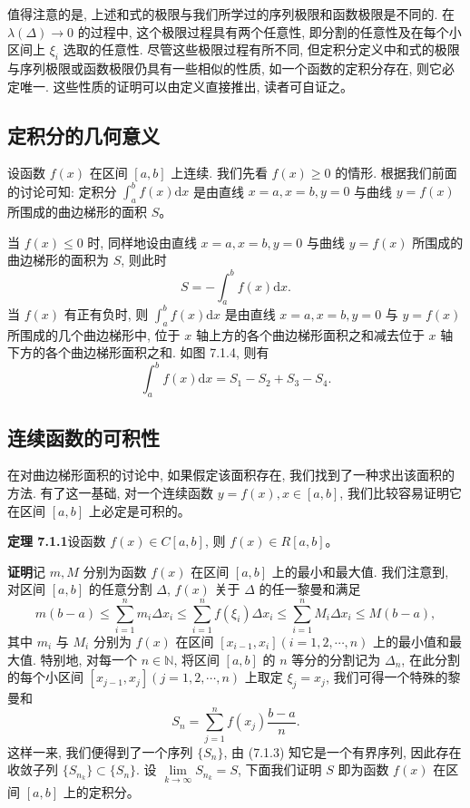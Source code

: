 \documentclass[UTF8, 12pt, fontset=fandol, oneside]{ctexart}
\begin{document}
值得注意的是, 上述和式的极限与我们所学过的序列极限和函数极限是不同的. 在 $\lambda(\Delta)\to0$ 的过程中, 这个极限过程具有两个任意性, 即分割的任意性及在每个小区间上 $\xi_i$ 选取的任意性. 尽管这些极限过程有所不同, 但定积分定义中和式的极限与序列极限或函数极限仍具有一些相似的性质, 如一个函数的定积分存在, 则它必定唯一. 这些性质的证明可以由定义直接推出, 读者可自证之。

\subsection{定积分的几何意义}

设函数 $f(x)$ 在区间 $[a,b]$ 上连续. 我们先看 $f(x)\geq0$ 的情形. 根据我们前面的讨论可知: 定积分 $\int_a^b f(x)\mathrm dx$ 是由直线 $x=a,x=b,y=0$ 与曲线 $y=f(x)$ 所围成的曲边梯形的面积 $S$。

当 $f(x)\leq0$ 时, 同样地设由直线 $x=a,x=b,y=0$ 与曲线 $y=f(x)$ 所围成的曲边梯形的面积为 $S$, 则此时
\[
  S=-\int_a^b f(x)\mathrm dx.
\]
当 $f(x)$ 有正有负时, 则 $\int_a^b f(x)\mathrm dx$ 是由直线 $x=a,x=b,y=0$ 与 $y=f(x)$ 所围成的几个曲边梯形中, 位于 $x$ 轴上方的各个曲边梯形面积之和减去位于 $x$ 轴下方的各个曲边梯形面积之和. 如图 7.1.4, 则有
\[
  \int_a^b f(x)\mathrm dx=S_1-S_2+S_3-S_4.
\]

\subsection{连续函数的可积性}

在对曲边梯形面积的讨论中, 如果假定该面积存在, 我们找到了一种求出该面积的方法. 有了这一基础, 对一个连续函数 $y=f(x),x\in[a,b]$, 我们比较容易证明它在区间 $[a,b]$ 上必定是可积的。

\noindent\textbf{定理 7.1.1}\quad 设函数 $f(x)\in C[a,b]$, 则 $f(x)\in R[a,b]$。

\noindent\textbf{证明}\quad 记 $m,M$ 分别为函数 $f(x)$ 在区间 $[a,b]$ 上的最小和最大值. 我们注意到, 对区间 $[a,b]$ 的任意分割 $\Delta$, $f(x)$ 关于 $\Delta$ 的任一黎曼和满足
\begin{equation}
  m(b-a)\leq \sum_{i=1}^n m_i\Delta x_i
  \leq \sum_{i=1}^n f(\xi_i)\Delta x_i
  \leq \sum_{i=1}^n M_i\Delta x_i
  \leq M(b-a),
  \tag{7.1.3}
\end{equation}
其中 $m_i$ 与 $M_i$ 分别为 $f(x)$ 在区间 $[x_{i-1},x_i](i=1,2,\cdots,n)$ 上的最小值和最大值. 特别地, 对每一个 $n\in\mathbb N$, 将区间 $[a,b]$ 的 $n$ 等分的分割记为 $\Delta_n$, 在此分割的每个小区间 $[x_{j-1},x_j](j=1,2,\cdots,n)$ 上取定 $\xi_j=x_j$, 我们可得一个特殊的黎曼和
\[
  S_n=\sum_{j=1}^n f(x_j)\frac{b-a}{n}.
\]
这样一来, 我们便得到了一个序列 $\{S_n\}$, 由 (7.1.3) 知它是一个有界序列, 因此存在收敛子列 $\{S_{n_k}\}\subset\{S_n\}$. 设 $\lim\limits_{k\to\infty}S_{n_k}=S$, 下面我们证明 $S$ 即为函数 $f(x)$ 在区间 $[a,b]$ 上的定积分。
\end{document}
